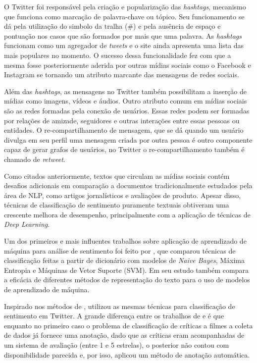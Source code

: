 O Twitter foi responsável pela criação e popularização das \textit{hashtags},
mecanismo que funciona como marcação de palavra-chave ou tópico.
Seu funcionamento se dá pela utilização do simbolo da tralha (\#) e pela ausência
de espaço e pontuação nos casos que são formados por mais que uma palavra.
As \textit{hashtags} funcionam como um agregador de \textit{tweets} e o site
ainda apresenta uma lista das mais populares no momento.
O sucesso dessa funcionalidade fez com que a mesma fosse posteriormente aderida
por outras mídias sociais como o Facebook e Instagram se tornando um
atributo marcante das mensagens de redes sociais.

Além das \textit{hashtags}, as mensagens no Twitter também possibilitam a
inserção de mídias como imagens, vídeos e áudios.
Outro atributo comum em mídias sociais são as redes formadas pela conexão de
usuários.
Essas redes podem ser formadas por relações de amizade, seguidores e outras
interações entre essas pessoas ou entidades.
O re-compartilhamento de mensagem, que se dá quando um usuário divulga em seu
perfil uma mensagem criada por outra pessoa é outro componente capaz de gerar
grafos de usuários, no Twitter o re-compartilhamento também é chamado de
\textit{retweet}.

Como citados anteriormente, textos que circulam as mídias sociais contém
desafios adicionais em comparação a documentos tradicionalmente estudados pela
área de NLP, como artigos jornalísticos e avaliações de produto.
Apesar disso, técnicas de classificação de sentimento puramente textuais
obtiveram uma crescente melhora de desempenho, principalmente com a aplicação de
técnicas de \textit{Deep Learning}.

Um dos primeiros e mais influentes trabalhos sobre aplicação de aprendizado de
máquina para análise de sentimento foi feito por \citet{pang02}, que comparou
técnicas de classificação feitas a partir de dicionário com modelos de
\textit{Naive Bayes}, Máxima Entropia e Máquinas de Vetor Suporte (SVM).
Em seu estudo \citet{pang02} também compara a eficácia de diferentes métodos de
representação do texto para o uso de modelos de aprendizado de máquina.

Inspirado nos métodos de \citet{pang02}, \citet{go09} utilizou as mesmas
técnicas para classificação de sentimento em Twitter.
A grande diferença entre os trabalhos de \citet{pang02} e \citet{go09} é que
enquanto no primeiro caso o problema de classificação de críticas a filmes
a coleta de dados já fornece uma anotação, dado que as críticas eram
acompanhadas de um sistema de avaliação (entre 1 e 5 estrelas), o posterior
não contou com disponibilidade parecida e, por isso, aplicou um método de
anotação automática.


